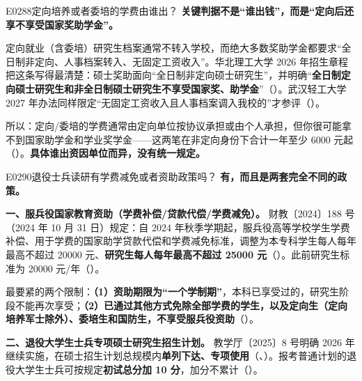 \begin{qa}{E0288}{定向培养或者委培的学费由谁出？}
\textbf{关键判据不是“谁出钱”，而是“定向后还享不享受国家奖助学金”。}

定向就业（含委培）研究生档案通常不转入学校，而绝大多数奖助学金都要求“全日制非定向、人事档案转入、无固定工资收入”。华北理工大学 2026 年招生章程把这条写得最清楚：硕士奖助面向“全日制非定向硕士研究生”，并明确“\textbf{全日制定向硕士研究生和非全日制硕士研究生不享受国家奖、助学金}”（）。武汉轻工大学 2027 年办法同样限定“无固定工资收入且人事档案调入我校的”才参评（）。

所以：定向/委培的学费通常由定向单位按协议承担或由个人承担，但你很可能拿不到国家助学金和学业奖学金——这两笔在非定向身份下合计一年至少 6000 元起（）。\textbf{具体谁出资因单位而异，没有统一规定。}
\end{qa}

\begin{qa}{E0290}{退役士兵读研有学费减免或者资助政策吗？}
\textbf{有，而且是两套完全不同的政策。}

\textbf{一、服兵役国家教育资助（学费补偿/贷款代偿/学费减免）。} 财教〔2024〕188 号（2024 年 10 月 31 日）规定：自 2024 年秋季学期起，服兵役高等学校学生学费补偿、用于学费的国家助学贷款代偿和学费减免标准，调整为本专科学生每人每年最高不超过 20000 元、\textbf{研究生每人每年最高不超过 25000 元}（）。此前研究生标准为 20000 元/年（）。

最要紧的两个限制：\textbf{（1）资助期限为“一个学制期”}，本科已享受过的，研究生阶段不能再次享受；\textbf{（2）已通过其他方式免除全部学费的学生，以及定向生（定向培养军士除外）、委培生和国防生，不享受服兵役资助}（）。

\textbf{二、退役大学生士兵专项硕士研究生招生计划。} 教学厅〔2025〕8 号明确 2026 年继续实施，在硕士招生计划总规模内\textbf{单列下达、专项使用}（、）。报考普通计划的退役大学生士兵可按规定\textbf{初试总分加 10 分}，加分不累计（）。
\end{qa}

